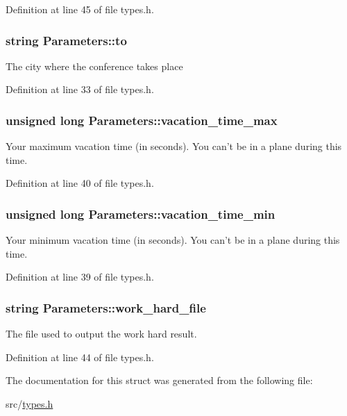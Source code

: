 Definition at line 45 of file types.\-h.

\hypertarget{struct_parameters_ab8ca164d6c88742405fb8506016aa150}{
\subsubsection[{to}]{\setlength{\rightskip}{0pt plus 5cm}string Parameters\-::to}}\label{struct_parameters_ab8ca164d6c88742405fb8506016aa150}
The city where the conference takes place 

Definition at line 33 of file types.\-h.

\hypertarget{struct_parameters_a36f22346c58dab71473c7920451f8100}{
\subsubsection[{vacation\-\_\-time\-\_\-max}]{\setlength{\rightskip}{0pt plus 5cm}unsigned long Parameters\-::vacation\-\_\-time\-\_\-max}}\label{struct_parameters_a36f22346c58dab71473c7920451f8100}
Your maximum vacation time (in seconds). You can't be in a plane during this time. 

Definition at line 40 of file types.\-h.

\hypertarget{struct_parameters_a9149c9562e23842a0bfeea6cf3435119}{
\subsubsection[{vacation\-\_\-time\-\_\-min}]{\setlength{\rightskip}{0pt plus 5cm}unsigned long Parameters\-::vacation\-\_\-time\-\_\-min}}\label{struct_parameters_a9149c9562e23842a0bfeea6cf3435119}
Your minimum vacation time (in seconds). You can't be in a plane during this time. 

Definition at line 39 of file types.\-h.

\hypertarget{struct_parameters_a5e8fd1fc0d362cde3e1e5094d3f8b253}{
\subsubsection[{work\-\_\-hard\-\_\-file}]{\setlength{\rightskip}{0pt plus 5cm}string Parameters\-::work\-\_\-hard\-\_\-file}}\label{struct_parameters_a5e8fd1fc0d362cde3e1e5094d3f8b253}
The file used to output the work hard result. 

Definition at line 44 of file types.\-h.



The documentation for this struct was generated from the following file\-:\begin{DoxyCompactItemize}
\item 
src/\hyperlink{types_8h}{types.\-h}\end{DoxyCompactItemize}
